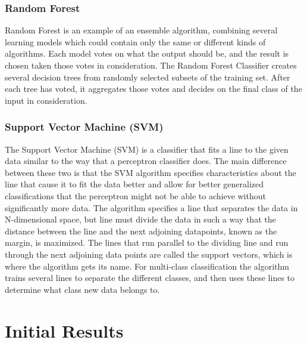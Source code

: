 \documentclass[fleqn,11pt]{article}
\begin{document}
\begin{multicols}{2}
            \subsubsection{Random Forest}
            Random Forest is an example of an ensemble algorithm, combining several learning 
            models which could contain only the same or different kinds of algorithms. Each model 
            votes on what the output should be, and the result is chosen taken those votes in 
            consideration. The Random Forest Classifier creates several decision trees from 
            randomly selected subsets of the training set. After each tree has voted, it 
            aggregates those votes and decides on the final class of the input in consideration.
            \subsubsection{Support Vector Machine (SVM)}
            The Support Vector Machine (SVM) is a classifier that fits a line to the given data 
            similar to the way that a perceptron classifier does. The main difference between 
            these two is that the SVM algorithm specifies characteristics about the line that 
            cause it to fit the data better and allow for better generalized classifications that 
            the perceptron might not be able to achieve without significantly more data. The 
            algorithm specifies a line that separates the data in N-dimensional space, but line 
            must divide the data in such a way that the distance between the line and the next 
            adjoining datapoints, known as the margin, is maximized. The lines that run parallel 
            to the dividing line and run through the next adjoining data points are called the 
            support vectors, which is where the algorithm gets its name. For multi-class 
            classification the algorithm trains several lines to separate the different classes, 
            and then uses these lines to determine what class new data belongs to.
        
    \section{Initial Results}

\end{multicols}
\end{document}
